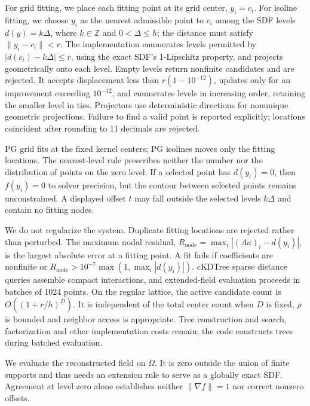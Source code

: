 \documentclass[12pt,letterpaper]{article}
\begin{document}
For grid fitting, we place each fitting point at its grid center, $y_i=c_i$. For isoline fitting, we choose $y_i$ as the nearest admissible point to $c_i$ among the SDF levels $d(y)=k\Delta$, where $k\in\mathbb Z$ and $0<\Delta\le h$; the distance must satisfy $\|y_i-c_i\|<r$. The implementation enumerates levels permitted by $|d(c_i)-k\Delta|\le r$, using the exact SDF's 1-Lipschitz property, and projects geometrically onto each level. Empty levels return nonfinite candidates and are rejected. It accepts displacement less than $r(1-10^{-12})$, updates only for an improvement exceeding $10^{-12}$, and enumerates levels in increasing order, retaining the smaller level in ties. Projectors use deterministic directions for nonunique geometric projections. Failure to find a valid point is reported explicitly; locations coincident after rounding to 11 decimals are rejected.

PG grid fits at the fixed kernel centers; PG isolines moves only the fitting locations. The nearest-level rule prescribes neither the number nor the distribution of points on the zero level. If a selected point has $d(y_i)=0$, then $f(y_i)=0$ to solver precision, but the contour between selected points remains unconstrained. A displayed offset $t$ may fall outside the selected levels $k\Delta$ and contain no fitting nodes.

We do not regularize the system. Duplicate fitting locations are rejected rather than perturbed. The maximum nodal residual, $R_{\mathrm{node}}=\max_i |(Aa)_i-d(y_i)|$, is the largest absolute error at a fitting point. A fit fails if coefficients are nonfinite or $R_{\mathrm{node}}>10^{-7}\max(1,\max_i|d(y_i)|)$. cKDTree sparse distance queries assemble compact interactions, and extended-field evaluation proceeds in batches of 1024 points. On the regular lattice, the active candidate count is $O((1+r/h)^D)$. It is independent of the total center count when $D$ is fixed, $\rho$ is bounded and neighbor access is appropriate. Tree construction and search, factorization and other implementation costs remain; the code constructs trees during batched evaluation.

We evaluate the reconstructed field on $\Omega$. It is zero outside the union of finite supports and thus needs an extension rule to serve as a globally exact SDF. Agreement at level zero alone establishes neither $\|\nabla f\|=1$ nor correct nonzero offsets.
\end{document}
